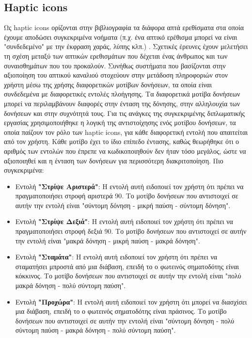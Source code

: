 \subsection{Haptic icons}
Ως haptic icons ορίζονται στην βιβλιογραφία τα διάφορα απτά ερεθίσματα στα οποία έχουμε αποδώσει συγκεκριμένα νοήματα (π.χ. ένα απτικό ερέθισμα μπορεί να είναι "συνδεδεμένο" με την έκφραση χαράς, λύπης κλπ.) \cite{chan2008designing}. Σχετικές έρευνες \cite{seifi2017exploiting, shieh2008tactile} έχουν μελετήσει τη σχέση μεταξύ των απτικών ερεθισμάτων που δέχεται ένας άνθρωπος και των συναισθημάτων που του προκαλούν. Συνήθως συστήματα που βασίζονται στην αξιοποίηση του απτικού καναλιού στοχεύουν στην μετάδοση πληροφοριών στον χρήστη μέσω της χρήσης διαφορετικών μοτίβων δονήσεων, τα οποία είναι συνδεδεμένα με διαφορετικές εντολές πλοήγησης. Τα διαφορετικά μοτίβα δονήσεων μπορεί να περιλαμβάνουν διαφορές στην ένταση της δόνησης, στην αλληλουχία των δονήσεων και στην συχνότητά τους. Για τις ανάγκες της συγκεκριμένης διπλωματικής εργασίας χρησιμοποιήθηκε η λογική της αντιστοίχησης ενός μοτίβου δονήσεων, τα οποία παίζουν τον ρόλο των haptic icons, για κάθε διαφορετική εντολή που απαιτείται από τον χρήστη. Κάθε μοτίβο έχει το ίδιο επίπεδο έντασης, καθώς θεωρήθηκε ότι ο αριθμός των εντολών που έπρεπε να κωδικοποιηθούν δεν ήταν τόσο μεγάλος, ώστε να αξιοποιηθεί και η ένταση των δονήσεων για περισσότερη διακριτοποίηση. Πιο συγκεκριμένα:
\begin{itemize}
    \item Εντολή \textbf{"Στρίψε Αριστερά"}: Η εντολή αυτή ειδοποιεί τον χρήστη ότι πρέπει να πραγματοποιήσει στροφή αριστερά 90\degree. Το μοτίβο δονήσεων που αντιστοιχεί σε αυτήν την εντολή είναι "σύντομη δόνηση - μικρή παύση - σύντομη δόνηση".
    \item Εντολή \textbf{"Στρίψε Δεξιά"}: Η εντολή αυτή ειδοποιεί τον χρήστη ότι πρέπει να πραγματοποιήσει στροφή δεξιά 90\degree. Το μοτίβο δονήσεων που αντιστοιχεί σε αυτήν την εντολή είναι "μακρά δόνηση - μικρή παύση - μακρά δόνηση".
    \item Εντολή \textbf{"Σταμάτα"}: Η εντολή αυτή ειδοποιεί τον χρήστη ότι πρέπει να σταματήσει μπροστά από μια διάβαση, επειδή το ο φωτεινός σηματοδότης είναι κόκκινος. Το μοτίβο δονήσεων που αντιστοιχεί σε αυτήν την εντολή είναι "πολύ μακρά δόνηση - πολύ σύντομη παύση".
    \item Εντολή \textbf{"Προχώρα"}: Η εντολή αυτή ειδοποιεί τον χρήστη ότι μπορεί να διασχίσει μια διάβαση, επειδή το ο φωτεινός σηματοδότης είναι πράσινος. Το μοτίβο δονήσεων που αντιστοιχεί σε αυτήν την εντολή είναι "σύντομη δόνηση - πολύ σύντομη παύση - μακρά δόνηση - πολύ σύντομη παύση".
\end{itemize}
